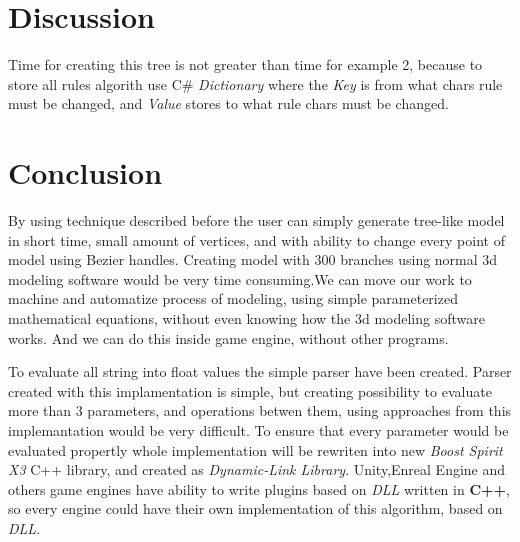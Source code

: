 \documentclass[b5paper,twoside,11pt]{article}
\begin{document}
\section{Discussion}


\par
 Time for creating this tree is not greater than time for example 2, because to store all rules algorith use C\# \textit{Dictionary} where the \textit{Key} is from what chars rule must be changed, and \textit{Value} stores to what rule chars must be changed.


 



\section{Conclusion}
By using technique described before the user can simply generate tree-like model in short time, small amount of vertices, and with ability to change every point of model using Bezier handles. Creating model with 300 branches using normal 3d modeling software would be very time consuming.We can move our work to machine and automatize process of modeling, using simple parameterized mathematical equations, without even knowing how the 3d modeling software works. And we can do this inside game engine, without other programs.

To evaluate all string into float values the simple parser have been created.
Parser created with this implamentation is simple, but creating possibility to evaluate more than 3 parameters, and operations betwen them, using approaches from this implemantation would be very difficult. To ensure that every parameter would be evaluated propertly whole implementation will be rewriten into new \textit{Boost Spirit X3} C++ library, and created as \textit{Dynamic-Link Library}. Unity,Enreal Engine and others game engines have ability to write plugins based on \textit{DLL} written in \textbf{C++}, so every engine could have their own implementation of this algorithm, based on \textit{DLL}.
\end{document}
